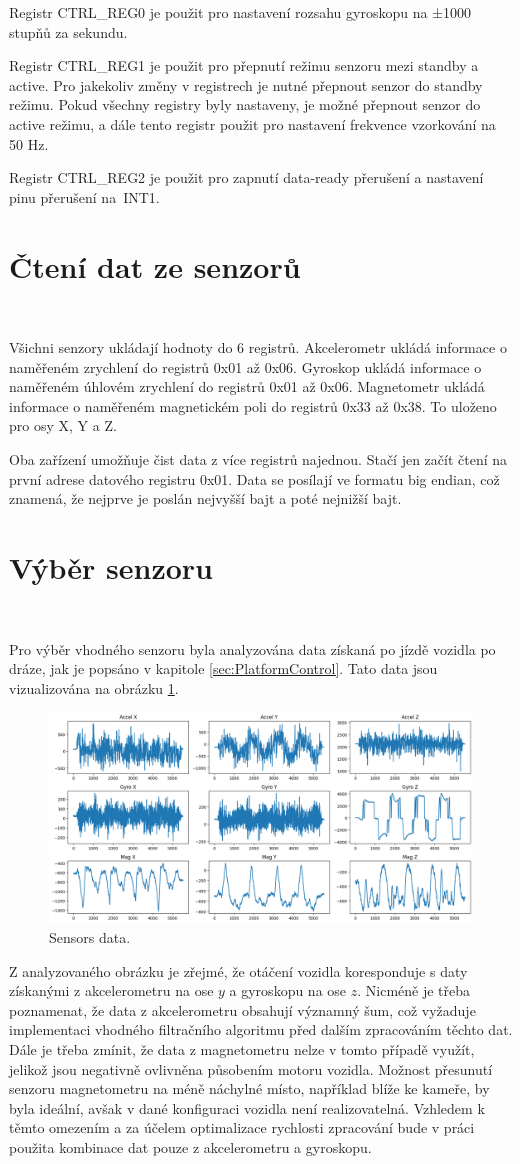 Registr CTRL\_REG0 je použit pro nastavení rozsahu gyroskopu na ±1000 stupňů za sekundu.

Registr CTRL\_REG1 je použit pro přepnutí režimu senzoru mezi standby a active. Pro jakekoliv
změny v registrech je nutné přepnout senzor do standby režimu. Pokud všechny registry byly
nastaveny, je možné přepnout senzor do active režimu, a dále tento registr použit pro nastavení frekvence vzorkování na 50 Hz.

Registr CTRL\_REG2 je použit pro zapnutí data-ready přerušení a nastavení pinu přerušení
na~INT1\cite{FXAS21002}.

\section{Čtení dat ze senzorů}\

Všichni senzory ukládají hodnoty do 6 registrů. Akcelerometr ukládá informace o
naměřeném zrychlení do registrů 0x01 až 0x06. Gyroskop ukládá informace o naměřeném
úhlovém zrychlení do registrů 0x01 až 0x06. Magnetometr ukládá informace o naměřeném
magnetickém poli do registrů 0x33 až 0x38. To uloženo pro osy X, Y a Z.

Oba zařízení umožňuje čist data z více registrů najednou. Stačí jen
začít čtení na první adrese datového registru 0x01. Data se posílají ve formatu
big endian, což znamená, že nejprve je poslán nejvyšší bajt a poté nejnižší bajt.

\section{Výběr senzoru}\

Pro výběr vhodného senzoru byla analyzována data získaná po jízdě vozidla po dráze, jak je popsáno v kapitole \ref{sec:PlatformControl}. Tato data jsou vizualizována na obrázku \ref{fig:Sensors}.
\begin{figure}[!h]
    \centering
    \includegraphics[width = 0.5\linewidth]{Figures/Sensors.png}
    \caption{Sensors data.}
    \label{fig:Sensors}
\end{figure}

Z analyzovaného obrázku je zřejmé, že otáčení vozidla koresponduje s daty získanými z akcelerometru na 
ose $y$ a gyroskopu na ose $z$. Nicméně je třeba poznamenat, že data z akcelerometru obsahují významný 
šum, což vyžaduje implementaci vhodného filtračního algoritmu před dalším zpracováním těchto dat. Dále 
je třeba zmínit, že data z magnetometru nelze v tomto případě využít, jelikož jsou negativně ovlivněna 
působením motoru vozidla. Možnost přesunutí senzoru magnetometru na méně náchylné místo, například 
blíže ke kameře, by byla ideální, avšak v dané konfiguraci vozidla není realizovatelná. Vzhledem k 
těmto omezením a za účelem optimalizace rychlosti zpracování bude v práci použita kombinace dat pouze z 
akcelerometru a gyroskopu.

\endinput
